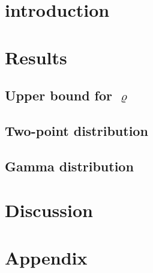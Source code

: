 \documentclass{scrartcl}
\begin{document}
\section{introduction}

  

\section{Results}

  

  \subsection*{Upper bound for $\varrho$}

    

  \subsection*{Two-point distribution}  

    

  \subsection*{Gamma distribution}

    

\section{Discussion}

  
    
    \newpage
\clearpage     
\section{Appendix}

  




\printbibliography
  
  
\end{document}
